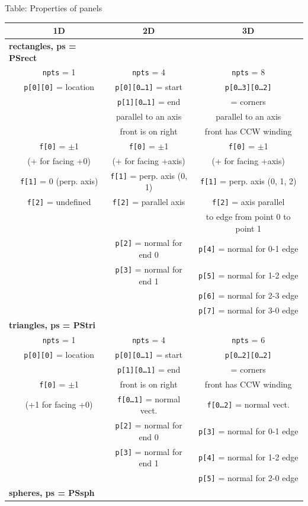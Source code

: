 \documentclass {scrbook}
\newcommand {\ttt} {\texttt}
\begin{document}
Table: Properties of panels

\begin{longtable}[c]{lccc}
&1D&2D&3D\\
\hline
\multicolumn{2}{l}{\textbf{rectangles, ps = PSrect}}\\
&\ttt{npts} = 1&\ttt{npts} = 4&\ttt{npts} = 8\\ 
&\ttt{p[0][0]} = location&\ttt{p[0][0\ldots1]} = start&\ttt{p[0\ldots3][0\ldots2]}\\ 
&&\ttt{p[1][0\ldots1]} = end&= corners\\ 
&&parallel to an axis&parallel to an axis\\ 
&&front is on right&front has CCW winding\\ 
&\ttt{f[0]} = $\pm$1&\ttt{f[0]} = $\pm$1&\ttt{f[0]} = $\pm$1\\ 
&(+ for facing +0)&(+ for facing +axis)&(+ for facing +axis)\\ 
&\ttt{f[1]} = 0 (perp. axis)&\ttt{f[1]} = perp. axis (0, 1)&\ttt{f[1]} = perp. axis (0, 1, 2)\\ 
&\ttt{f[2]} = undefined&\ttt{f[2]} = parallel axis&\ttt{f[2]} = axis parallel\\ 
&&&to edge from point 0 to point 1\\
&&\ttt{p[2]} = normal for end 0&\ttt{p[4]} = normal for 0-1 edge\\
&&\ttt{p[3]} = normal for end 1&\ttt{p[5]} = normal for 1-2 edge\\
&&&\ttt{p[6]} = normal for 2-3 edge\\
&&&\ttt{p[7]} = normal for 3-0 edge\\
\hline
\multicolumn{2}{l}{\textbf{triangles, ps = PStri}}\\
&\ttt{npts} = 1&\ttt{npts} = 4&\ttt{npts} = 6\\ 
&\ttt{p[0][0]} = location&\ttt{p[0][0\ldots1]} = start&\ttt{p[0\ldots2][0\ldots2]}\\ 
&&\ttt{p[1][0\ldots1]} = end&= corners\\ 
&\ttt{f[0]} = $\pm$1&front is on right&front has CCW winding\\ 
&(+1 for facing +0)&\ttt{f[0\ldots1]} = normal vect.&\ttt{f[0\ldots2]} = normal vect.\\
&&\ttt{p[2]} = normal for end 0&\ttt{p[3]} = normal for 0-1 edge\\
&&\ttt{p[3]} = normal for end 1&\ttt{p[4]} = normal for 1-2 edge\\
&&&\ttt{p[5]} = normal for 2-0 edge\\
\hline
\multicolumn{2}{l}{\textbf{spheres, ps = PSsph}}\\

\end{longtable}
\end{document}
